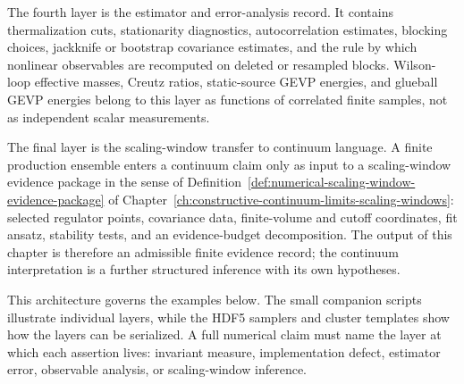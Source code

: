 The fourth layer is the estimator and error-analysis record.  It contains
thermalization cuts, stationarity diagnostics, autocorrelation estimates,
blocking choices, jackknife or bootstrap covariance estimates, and the rule
by which nonlinear observables are recomputed on deleted or resampled blocks.
Wilson-loop effective masses, Creutz ratios, static-source GEVP energies,
and glueball GEVP energies belong to this layer as functions of correlated
finite samples, not as independent scalar measurements.

The final layer is the scaling-window transfer to continuum language.  A
finite production ensemble enters a continuum claim only as input to a
scaling-window evidence package in the sense of
Definition~\ref{def:numerical-scaling-window-evidence-package} of
Chapter~\ref{ch:constructive-continuum-limits-scaling-windows}: selected
regulator points, covariance data, finite-volume and cutoff coordinates,
fit ansatz, stability tests, and an evidence-budget decomposition.  The
output of this chapter is therefore an admissible finite evidence record; the
continuum interpretation is a further structured inference with its own
hypotheses.

This architecture governs the examples below.  The small companion scripts
illustrate individual layers, while the HDF5 samplers and cluster templates
show how the layers can be serialized.  A full numerical claim must name the
layer at which each assertion lives: invariant measure, implementation
defect, estimator error, observable analysis, or scaling-window inference.

